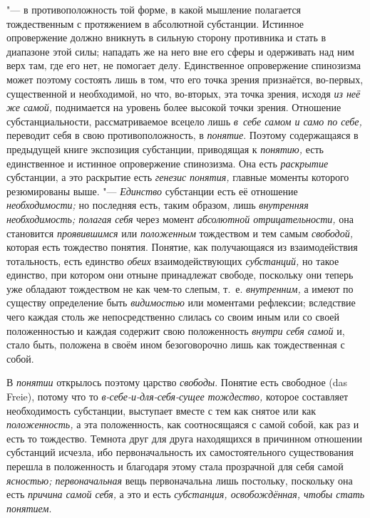 "--- в противоположность той форме, в какой мышление полагается
тождественным с протяжением в абсолютной субстанции. Истинное опровержение
должно вникнуть в сильную сторону противника и стать в
диапазоне этой силы; нападать же на него вне его сферы и одерживать над ним
верх там, где его нет, не помогает делу. Единственное опровержение
спинозизма может поэтому состоять лишь в том, что его точка зрения
признаётся, во-первых, существенной и необходимой, но что, во-вторых, эта
точка зрения, исходя {\em из неё же самой,} поднимается на уровень более
высокой точки зрения. Отношение субстанциальности, рассматриваемое всецело
лишь {\em в~себе самом и само по себе,} переводит себя в свою
противоположность, в {\em понятие}. Поэтому содержащаяся в предыдущей книге
экспозиция субстанции, приводящая к {\em понятию,} есть единственное и
истинное опровержение спинозизма. Она есть {\em раскрытие} субстанции, а это
раскрытие есть {\em генезис понятия,} главные моменты которого резюмированы
выше. "--- {\em Единство} субстанции есть её отношение {\em необходимости;}
но последняя есть, таким образом, лишь {\em внутренняя необходимость;
полагая себя} через момент {\em абсолютной отрицательности,} она
становится {\em проявившимся} или {\em положенным} тождеством и тем самым
{\em свободой,} которая есть тождество понятия. Понятие, как получающаяся из
взаимодействия тотальность, есть единство {\em обеих} взаимодействующих
{\em субстанций,} но такое единство, при котором они отныне принадлежат
свободе, поскольку они теперь уже обладают тождеством не как чем-то слепым,
т.~е. {\em внутренним,} а имеют по существу определение быть {\em видимостью}
или моментами рефлексии; вследствие чего каждая столь же непосредственно
слилась со своим иным или со своей положенностью и каждая содержит свою
положенность {\em внутри себя самой} и, стало быть, положена в своём ином
безоговорочно лишь как тождественная с собой.

В {\em понятии} открылось поэтому царство {\em свободы}. Понятие есть
свободное (das Freie), потому что то {\em в-себе-и-для-себя-сущее тождество,}
которое составляет необходимость субстанции, выступает вместе с тем как
снятое или как {\em положенность,} а эта положенность, как соотносящаяся с
самой собой, как раз и есть то тождество. Темнота друг для друга находящихся
в причинном отношении субстанций исчезла, ибо первоначальность их
самостоятельного существования перешла в положенность и благодаря этому
стала прозрачной для себя самой {\em ясностью; первоначальная}
вещь
первоначальна лишь постольку, поскольку она есть {\em причина самой себя,}
а это и есть {\em субстанция, освобождённая, чтобы стать понятием}.

